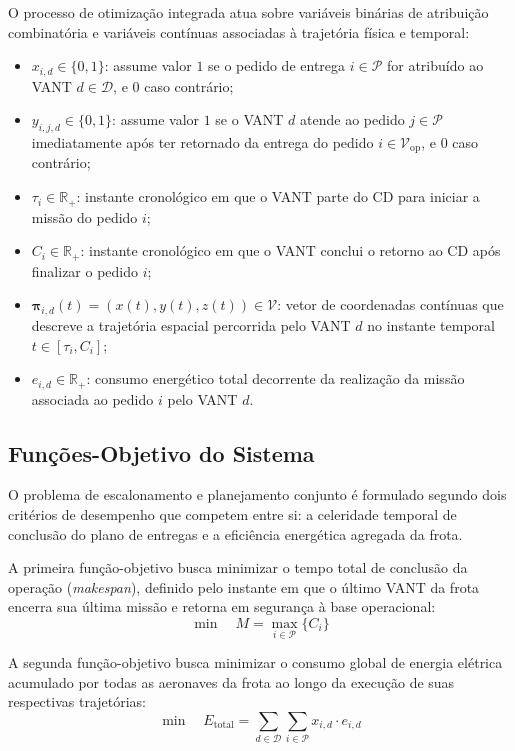 O processo de otimização integrada atua sobre variáveis binárias de atribuição combinatória e variáveis contínuas associadas à trajetória física e temporal:

\begin{itemize}
    \item $x_{i, d} \in \{0, 1\}$: assume valor $1$ se o pedido de entrega $i \in \mathcal{P}$ for atribuído ao VANT $d \in \mathcal{D}$, e $0$ caso contrário;
    \item $y_{i, j, d} \in \{0, 1\}$: assume valor $1$ se o VANT $d$ atende ao pedido $j \in \mathcal{P}$ imediatamente após ter retornado da entrega do pedido $i \in \mathcal{V}_{\text{op}}$, e $0$ caso contrário;
    \item $\tau_i \in \mathbb{R}_+$: instante cronológico em que o VANT parte do CD para iniciar a missão do pedido $i$;
    \item $C_i \in \mathbb{R}_+$: instante cronológico em que o VANT conclui o retorno ao CD após finalizar o pedido $i$;
    \item $\boldsymbol{\pi}_{i, d}(t) = (x(t), y(t), z(t)) \in \mathcal{V}$: vetor de coordenadas contínuas que descreve a trajetória espacial percorrida pelo VANT $d$ no instante temporal $t \in [\tau_i, C_i]$;
    \item $e_{i, d} \in \mathbb{R}_+$: consumo energético total decorrente da realização da missão associada ao pedido $i$ pelo VANT $d$.
\end{itemize}

\subsection{Funções-Objetivo do Sistema}

O problema de escalonamento e planejamento conjunto é formulado segundo dois critérios de desempenho que competem entre si: a celeridade temporal de conclusão do plano de entregas e a eficiência energética agregada da frota.

A primeira função-objetivo busca minimizar o tempo total de conclusão da operação (\textit{makespan}), definido pelo instante em que o último VANT da frota encerra sua última missão e retorna em segurança à base operacional:
\begin{equation}\label{eq:obj_makespan}
\min \quad M = \max_{i \in \mathcal{P}} \{ C_i \}
\end{equation}

A segunda função-objetivo busca minimizar o consumo global de energia elétrica acumulado por todas as aeronaves da frota ao longo da execução de suas respectivas trajetórias:
\begin{equation}\label{eq:obj_energia}
\min \quad E_{\text{total}} = \sum_{d \in \mathcal{D}} \sum_{i \in \mathcal{P}} x_{i, d} \cdot e_{i, d}
\end{equation}

